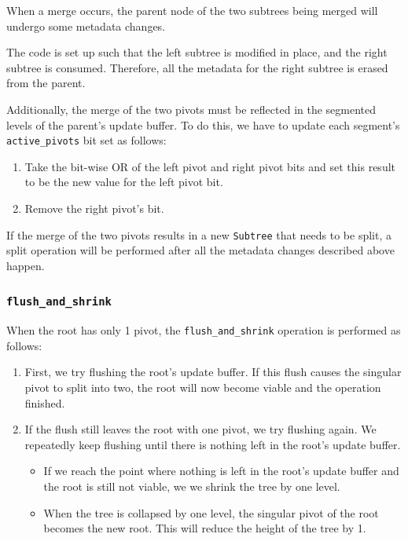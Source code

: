 \documentclass[11pt]{article}
\begin{document}
When a merge occurs, the parent node of the two subtrees being merged will undergo some metadata changes.

The code is set up such that the left subtree is modified in place, and the right subtree is consumed. Therefore, all the metadata for the right subtree is erased from the parent.

Additionally, the merge of the two pivots must be reflected in the segmented levels of the parent's update buffer. To do this, we have to update each segment's \texttt{active\_pivots} bit set as follows:
\begin{enumerate}
    \item Take the bit-wise OR of the left pivot and right pivot bits and set this result to be the new value for the left pivot bit.
    \item Remove the right pivot's bit.
\end{enumerate}

If the merge of the two pivots results in a new \texttt{Subtree} that needs to be split, a split operation will be performed after all the metadata changes described above happen.

\subsubsection{\texttt{flush\_and\_shrink}}

When the root has only 1 pivot, the \texttt{flush\_and\_shrink} operation is performed as follows:
\begin{enumerate}
    \item First, we try flushing the root's update buffer. If this flush causes the singular pivot to split into two, the root will now become viable and the operation finished.
    \item If the flush still leaves the root with one pivot, we try flushing again. We repeatedly keep flushing until there is nothing left in the root's update buffer.
    \begin{itemize}
        \item If we reach the point where nothing is left in the root's update buffer and the root is still not viable, we we shrink the tree by one level.
        \item When the tree is collapsed by one level, the singular pivot of the root becomes the new root. This will reduce the height of the tree by 1.
    \end{itemize}
\end{enumerate}
\end{document}
